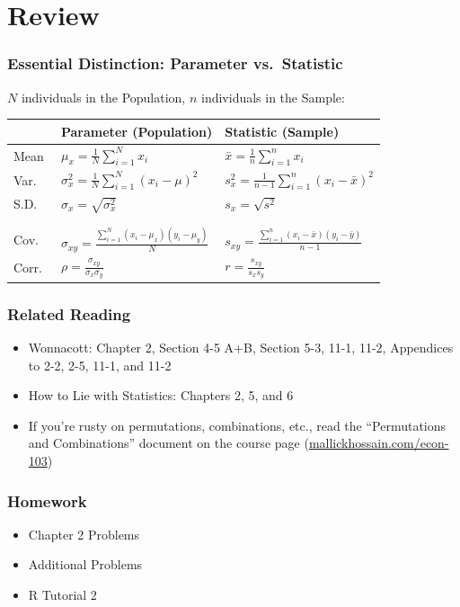 \documentclass{beamer}
\begin{document}
\section{Review}
\begin{frame}
\frametitle{Essential Distinction: Parameter vs.\ Statistic}
	$N$ individuals in the Population, $n$ individuals in the Sample:
	\vspace{1em}
	\small
	\begin{tabular}{l|l|l}
		&\textbf{Parameter} (Population)&\textbf{Statistic} (Sample)\\
		\hline
		Mean&$\displaystyle\mu_x = \frac{1}{N} \sum_{i = 1}^N x_i$& $\displaystyle\bar{x} = \frac{1}			{n} \sum_{i = 1}^n x_i$ \\
		Var.\ &$\displaystyle \sigma_x^2 = \frac{1}{N}\sum_{i = 1}^N (x_i - \mu)^2$ &$\displaystyle 			s_x^2 = \frac{1}{n - 1}\sum_{i = 1}^n(x_i - \bar{x})^2$\\
		S.D.\ &$\sigma_x = \sqrt{\sigma_x^2}$ &$s_x = \sqrt{s^2}$ \\
		&&\\
		\hline
		&&\\
		\alert{Cov.\ }&\alert{$\displaystyle \sigma_{xy} = \frac{\sum_{i = 1}^N(x_i - \mu_x)(y_i - 				\mu_y)}{N}$} &\alert{$\displaystyle s_{xy} = \frac{\sum_{i = 1}^n(x_i - \bar{x})(y_i - \bar{y})}			{n - 1}$}\\
		\alert{Corr.\ } & \alert{$\displaystyle \rho = \frac{\sigma_{xy}}{\sigma_x \sigma_y}$}& 					\alert{$\displaystyle r = \frac{s_{xy}}{s_x s_y}$}
	\end{tabular}
\end{frame}

\begin{frame}
\frametitle{Related Reading}
	\begin{itemize}
		\item Wonnacott: Chapter 2, Section 4-5 A+B, Section 5-3, 11-1, 11-2, Appendices to 2-2, 2-5, 11-1, and 11-2
		\item How to Lie with Statistics: Chapters 2, 5, and 6
		\item If you're rusty on permutations, combinations, etc., read the ``Permutations and Combinations'' document on the course page (\url{mallickhossain.com/econ-103})
	\end{itemize}
\end{frame}

\begin{frame}
\frametitle{Homework}
	\begin{itemize}
		\item Chapter 2 Problems
		\item Additional Problems
		\item R Tutorial 2
	\end{itemize}
\end{frame}

\end{document}
